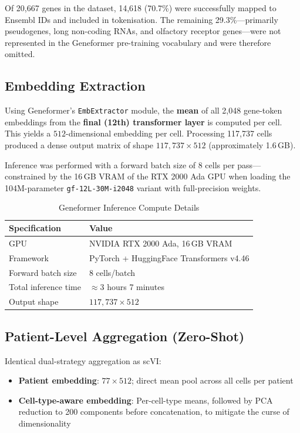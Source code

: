 Of 20,667 genes in the dataset, 14,618 (70.7\%) were successfully mapped to Ensembl IDs and included in tokenisation. The remaining 29.3\%---primarily pseudogenes, long non-coding RNAs, and olfactory receptor genes---were not represented in the Geneformer pre-training vocabulary and were therefore omitted.

\subsection{Embedding Extraction}

Using Geneformer's \texttt{EmbExtractor} module, the \textbf{mean} of all 2,048 gene-token embeddings from the \textbf{final (12th) transformer layer} is computed per cell. This yields a $512$-dimensional embedding per cell. Processing 117,737 cells produced a dense output matrix of shape $117{,}737 \times 512$ (approximately 1.6\,GB).

Inference was performed with a forward batch size of 8 cells per pass---constrained by the 16\,GB VRAM of the RTX 2000 Ada GPU when loading the 104M-parameter \texttt{gf-12L-30M-i2048} variant with full-precision weights.

\begin{table}[ht]
\centering
\caption{Geneformer Inference Compute Details}
\label{tab:geneformer_compute}
\begin{tabular}{ll}
\toprule
\textbf{Specification} & \textbf{Value} \\
\midrule
GPU & NVIDIA RTX 2000 Ada, 16\,GB VRAM \\
Framework & PyTorch + HuggingFace Transformers v4.46 \\
Forward batch size & 8 cells/batch \\
Total inference time & $\approx$3 hours 7 minutes \\
Output shape & $117{,}737 \times 512$ \\
\bottomrule
\end{tabular}
\end{table}

\subsection{Patient-Level Aggregation (Zero-Shot)}

Identical dual-strategy aggregation as scVI:
\begin{itemize}
    \item \textbf{Patient embedding}: $77 \times 512$; direct mean pool across all cells per patient
    \item \textbf{Cell-type-aware embedding}: Per-cell-type means, followed by PCA reduction to 200 components before concatenation, to mitigate the curse of dimensionality
\end{itemize}

